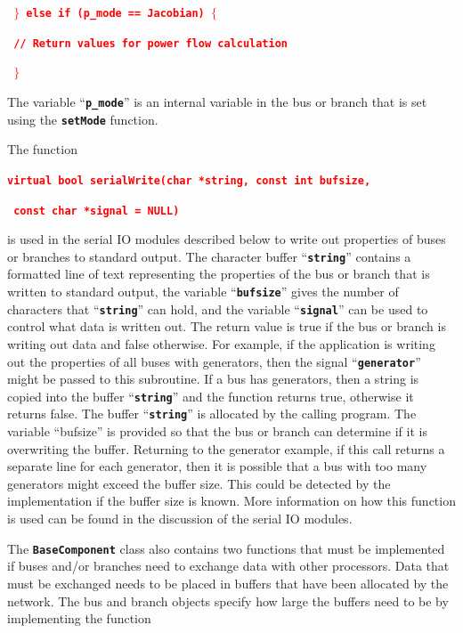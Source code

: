 \documentclass[12pt]{report} %
\begin{document}
\textcolor{red}{\texttt{\textbf{    $\boldsymbol{\mathrm{\}}}$ else if (p\_mode == Jacobian) $\boldsymbol{\mathrm{\{}}$}}}

\textcolor{red}{\texttt{\textbf{      // Return values for power flow calculation}}}

\textcolor{red}{\texttt{\textbf{    $\boldsymbol{\mathrm{\}}}$}}}

The variable ``\texttt{\textbf{p\_mode}}'' is an internal variable in the bus or branch that is set using the \texttt{\textbf{setMode}} function.

The function

\textcolor{red}{\texttt{\textbf{virtual bool serialWrite(char *string, const int bufsize,}}}

\textcolor{red}{\texttt{\textbf{                         const char *signal = NULL)}}}

is used in the serial IO modules described below to write out properties of buses or branches to standard output. The character buffer ``\texttt{\textbf{string}}'' contains a formatted line of text representing the properties of the bus or branch that is written to standard output, the variable ``\texttt{\textbf{bufsize}}'' gives the number of characters that ``\texttt{\textbf{string}}'' can hold, and the variable ``\texttt{\textbf{signal}}'' can be used to control what data is written out. The return value is true if the bus or branch is writing out data and false otherwise. For example, if the application is writing out the properties of all buses with generators, then the signal ``\texttt{\textbf{generator}}'' might be passed to this subroutine. If a bus has generators, then a string is copied into the buffer ``\texttt{\textbf{string}}'' and the function returns true, otherwise it returns false. The buffer ``\texttt{\textbf{string}}'' is allocated by the calling program. The variable ``bufsize'' is provided so that the bus or branch can determine if it is overwriting the buffer. Returning to the generator example, if this call returns a separate line for each generator, then it is possible that a bus with too many generators might exceed the buffer size. This could be detected by the implementation if the buffer size is known. More information on how this function is used can be found in the discussion of the serial IO modules.

The \texttt{\textbf{BaseComponent}} class also contains two functions that must be implemented if buses and/or branches need to exchange data with other processors. Data that must be exchanged needs to be placed in buffers that have been allocated by the network. The bus and branch objects specify how large the buffers need to be by implementing the function
\end{document}
